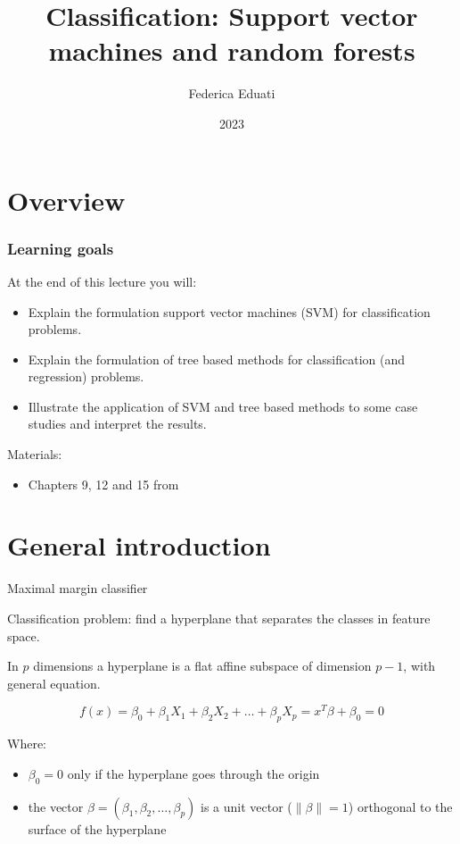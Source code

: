 \documentclass[notes]{beamer}          %
\title{Classification: Support vector machines and random forests}
\author{Federica Eduati}
\institute{Eindhoven University of Technology

Department of Biomedical Engineering}
\date{2023}
\newcommand{\norm}[1]{\left\lVert#1\right\rVert}
\providecommand{\norm}[1]{\lVert#1\rVert}
\begin{document}
 
\frame{\titlepage}
 
\section{Overview}

\begin{frame}
\frametitle{Learning goals}

At the end of this lecture you will:
\begin{itemize}
    \item Explain the formulation support vector machines (SVM) for classification problems.
    \item Explain the formulation of tree based methods for classification (and regression) problems.
    \item Illustrate the application of SVM and tree based methods to some case studies and interpret the results.
\end{itemize}

\vspace{5mm} 

Materials: 
\begin{itemize}
    \item Chapters 9, 12 and 15 from \cite{elements}
\end{itemize}

\end{frame}




\section{General introduction}
\begin{frame}{Maximal margin classifier}

Classification problem: find a hyperplane that separates the classes in feature space.

\vspace{5mm} 

In $p$ dimensions a hyperplane is a flat affine subspace of dimension $p-1$, with general equation.

\begin{equation}
    f(x) = \beta_0 + \beta_1 X_1 + \beta_2 X_2 + \dots + \beta_p X_p = x^T\beta + \beta_0 = 0
\end{equation}

Where:
\begin{itemize}
    \item $\beta_0 = 0$ only if the hyperplane goes through the origin \item the vector $\beta = (\beta_1, \beta_2, \dots, \beta_p)$ is a unit vector ($\norm{\beta} = 1$) orthogonal to the surface of the hyperplane
\end{itemize}
    
\end{frame}
\end{document}
